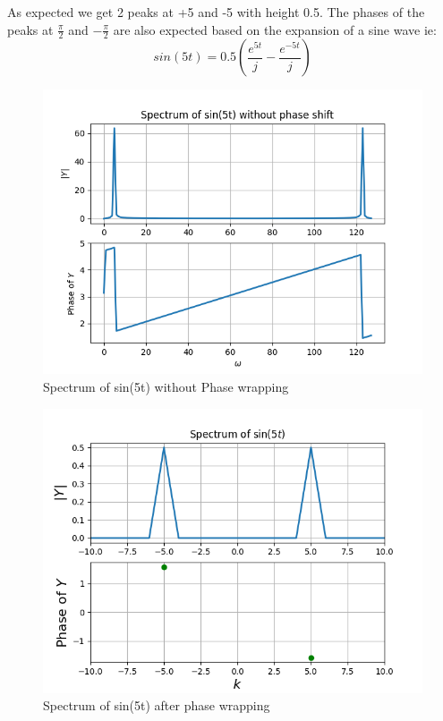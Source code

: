 \documentclass{article}
\begin{document}
As expected we get 2 peaks at +5 and -5 with height 0.5. The phases of the peaks at $\frac{\pi}{2}$ and $-\frac{\pi}{2}$ are also expected based on the expansion of a sine wave ie:
\begin{equation}
sin(5t) = 0.5(\frac{e^{5t}}{j}-\frac{e^{-5t}}{j})
\end{equation}
\begin{figure}[h!]
\centering
\includegraphics[scale=0.6]{fig9-1.png}
\caption{Spectrum of sin(5t) without Phase wrapping}
\label{fig:universe}
\end{figure}

\begin{figure}[h!]
\centering
\includegraphics[scale=0.6]{fig9-2.png}
\caption{Spectrum of sin(5t) after phase wrapping}
\label{fig:universe}
\end{figure}
\end{document}
